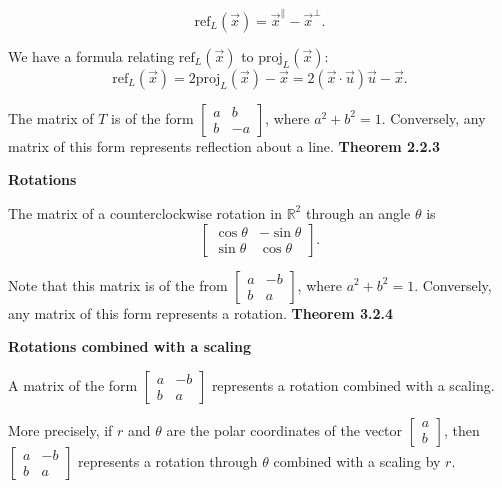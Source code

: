 \[\textrm{ref}_{L}(\vec{x})=\vec{x}^{\parallel}-\vec{x}^{\bot}.\]
\par\noindent We have a formula relating $\textrm{ref}_{L}(\vec{x})$ to $\textrm{proj}_{L}(\vec{x})$:
\[\textrm{ref}_{L}(\vec{x})=2\textrm{proj}_{L}(\vec{x})-\vec{x}=2(\vec{x}\cdot\vec{u})\vec{u}-\vec{x}.\]
\par\noindent The matrix of $T$ is of the form $\displaystyle\left[\begin{array}{rr}a&b\\ b&-a\end{array}\right]$, where $a^{2}+b^{2}=1$. Conversely, any matrix of this form represents reflection about a line.
\textbf{Theorem 2.2.3}\\
\par\noindent\textbf{Rotations}
\par\noindent The matrix of a counterclockwise rotation in $\mathbb{R}^{2}$ through an angle $\theta$ is
\[\left[\begin{array}{rr}\cos{}\theta{}&-\sin{}\theta{}\\ \sin{}\theta{}&\cos{}\theta{}\end{array}\right].\]
\par\noindent Note that this matrix is of the from $\displaystyle\left[\begin{array}{rr}a&-b\\ b&a\end{array}\right]$, where $a^{2}+b^{2}=1$. Conversely, any matrix of this form represents a rotation.
\textbf{Theorem 3.2.4}\\
\par\noindent\textbf{Rotations combined with a scaling}
\par\noindent A matrix of the form $\displaystyle\left[\begin{array}{rr}a&-b\\ b&a\end{array}\right]$ represents a rotation combined with a scaling.
\par\noindent More precisely, if $r$ and $\theta$ are the polar coordinates of the vector $\displaystyle\left[\begin{array}{r}a\\ b\end{array}\right]$, then $\displaystyle\left[\begin{array}{rr}a&-b\\ b&a\end{array}\right]$ represents a rotation through $\theta$ combined with a scaling by $r$.
